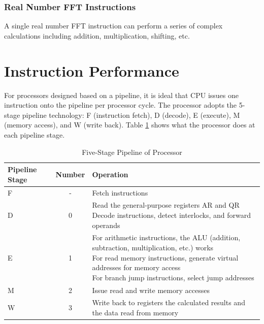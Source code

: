 \documentclass[main\_\_EN.tex]{subfiles}
\begin{document}
\subsubsection{Real Number FFT Instructions}

A single real number FFT instruction can perform a series of complex calculations including addition, multiplication, shifting, etc.














\section{Instruction Performance}\label{subsec:pie_pipeline}
For processors designed based on a pipeline, it is ideal that CPU issues one instruction onto the pipeline per processor cycle. The \chipname{} processor adopts the 5-stage pipeline technology: F (instruction fetch), D (decode), E (execute), M (memory access), and W (write back). Table \ref{tab:pie_processor_5stage} shows what the processor does at each pipeline stage.\\

\begin{longtable}[c]{|l|c|l|}
    \caption{Five-Stage Pipeline of \chipname{} Processor}
    \label{tab:pie_processor_5stage}\\
    \hline
    \rowcolor{lightgray}
    \textbf{Pipeline Stage} & \textbf{Number} & \textbf{Operation} \\\hline
    F & - & Fetch instructions\\\hline
    D & 0 & \makecell[l]{Read the general-purpose registers AR and QR\\Decode instructions, detect interlocks, and forward operands}\\\hline
    E & 1 & \makecell[l]{For arithmetic instructions, the ALU (addition, subtraction, multiplication, etc.) works\\For read memory instructions, generate virtual addresses for memory access\\For branch jump instructions, select jump addresses}\\\hline
    M & 2 & Issue read and write memory accesses \\\hline
    W & 3 & Write back to registers the calculated results and the data read from memory\\\hline
\end{longtable}
\end{document}
